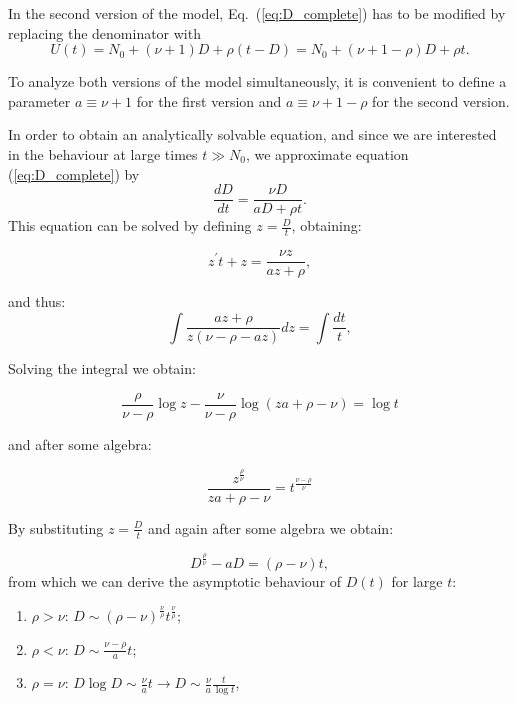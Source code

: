\documentclass[graybox]{svmult}
\begin{document}
In the second version of the model, Eq.~(\ref{eq:D_complete}) has to be modified by replacing the denominator with
\[
	U(t) = N_0+(\nu+1) D+\rho (t-D)= N_0+(\nu+1-\rho) D+\rho t.
\]

To analyze both versions of the model simultaneously, it is convenient to define a parameter $a \equiv \nu+1$ for the first version and $a \equiv \nu+1-\rho$ for the second version.

In order to obtain an analytically solvable equation, and  since we are interested in the behaviour at large times $t \gg N_0$, we approximate equation (\ref{eq:D_complete}) by 
%
\begin{equation}
\frac{d D}{dt}= \frac{\nu D}{ a D+ \rho t}.\label{eq:D}
\end{equation}
%
 This equation can be solved by defining $z=\frac{D}{t}$, obtaining:
 
 \begin{equation}
   z^\prime t + z= \frac{\nu z}{a z+\rho} ,\label{eq:zprime}
 \end{equation}
 
 \noindent and thus:
 \begin{equation}
 \int \frac{a z +\rho}{z(\nu-\rho -a z)}dz = \int \frac{dt}{t},\label{eq:z}
 \end{equation}
 
 
 \noindent Solving the integral we obtain:
 
 \begin{equation}
   \frac{\rho}{\nu-\rho}\log{z}  - \frac{\nu}{\nu-\rho}\log{\left( z a+\rho-\nu\right)} =\log{t} \nonumber
 \end{equation}
 
 \noindent and after some algebra:
 
 
 \begin{equation}
 \frac{z^{\frac{\rho}{\nu}}}{z a+\rho-\nu}=t^{\frac{\nu-\rho}{\nu}} 
 \end{equation}
 
 \noindent By substituting $z=\frac{D}{t}$ and again after some algebra we obtain:
 
 \begin{equation}
 D^{\frac{\rho}{\nu}}- a D = (\rho-\nu) t,
 \label{eq:Dfinal}
 \end{equation}
%
from which we can derive the asymptotic behaviour of $D(t)$ for large $t$:
%
\begin{enumerate}
\item $\rho > \nu$: $D \sim (\rho-\nu)^{\frac{\nu}{\rho}} t^{\frac{\nu}{\rho}}$;\\
\item $\rho < \nu$: $D \sim \frac{\nu-\rho}{a}t$;\\
\item $\rho = \nu$: $D \log D \sim \frac{\nu}{a} t \rightarrow D \sim \frac{\nu}{a} \frac{t}{\log t}$,\\
\end{enumerate}
\end{document}
